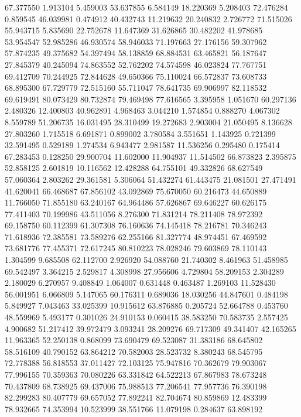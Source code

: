 67.377550
1.913104
5.459003
53.637855
6.584149
18.220369
5.208403
72.476284
0.859545
46.039981
0.474912
40.432743
11.219632
20.240832
2.726772
71.515026
55.943715
5.835690
22.752678
11.647369
31.626865
30.482202
41.978685
53.954547
52.985286
46.930574
58.946033
71.197663
27.176156
59.307962
57.874235
49.375682
54.397494
58.138859
68.884531
63.465821
56.187647
27.845379
40.245094
74.863552
52.762202
74.574598
46.023824
77.767751
69.412709
70.244925
72.844628
49.650366
75.110024
66.572837
73.608733
68.895300
67.729779
72.515160
55.711047
78.641735
69.906997
82.118532
69.619491
80.073429
80.732874
79.469498
77.616565
3.395958
1.051670
60.297136
2.480326
12.400803
40.962891
4.968463
3.044210
1.574854
0.888270
4.067302
8.559789
51.206735
16.031495
28.310499
19.272683
2.903004
21.050495
8.136628
27.803260
1.715518
6.691871
0.899002
3.780584
3.551651
1.143925
0.721399
32.591495
0.529189
1.274534
6.943477
2.981587
11.536256
0.295480
0.175414
67.283453
0.128250
29.900704
11.602000
11.904937
11.514502
66.873823
2.395875
52.858125
2.601819
10.116562
12.428288
64.755101
49.332826
68.627549
57.060364
2.803262
29.361581
5.306064
51.432274
61.443475
21.081501
27.471491
41.620041
66.468687
67.856102
43.092869
75.670050
60.216473
44.650889
11.766050
71.855180
63.240167
64.964486
57.626867
69.646227
60.626175
77.411403
70.199986
43.511056
8.276300
71.831214
78.211408
78.972392
69.158750
60.112399
61.307308
76.160636
74.145418
78.216781
70.346243
71.618936
72.385581
73.589276
62.255166
81.327774
48.974451
67.469592
73.681776
77.455371
72.617245
80.810223
78.028246
79.603869
78.110143
1.304599
9.685508
62.112700
2.926920
54.088760
21.740302
8.461963
51.458985
69.542497
3.364215
2.529817
4.308998
27.956606
4.729804
58.209153
2.304289
2.180029
6.270957
9.408849
1.064007
0.631448
0.463487
1.269103
11.528430
56.001951
6.066809
5.147065
60.176311
0.689036
18.030256
44.847601
0.484198
5.849927
7.043463
33.025399
10.915612
63.876885
0.205724
52.664788
0.453760
48.559969
5.493177
0.301026
24.910153
0.060415
38.583250
70.583735
2.557425
4.900682
51.217412
39.972479
3.093241
28.209276
69.717309
49.341407
42.165265
11.963365
52.250138
0.868099
73.690479
69.523087
31.383186
68.645802
58.516109
40.790152
63.864212
70.582003
28.523732
8.380243
68.545795
72.778388
56.818553
37.011427
72.103125
75.947816
70.362679
79.903067
77.996155
70.359363
70.080226
63.331842
64.522213
67.867983
78.673248
70.437809
68.738925
69.437006
75.988513
77.206541
77.957736
76.390198
82.299283
80.407779
69.657052
77.892241
82.704674
80.859869
12.483399
78.932665
74.353994
10.523999
38.551766
11.079198
0.284637
63.898192
